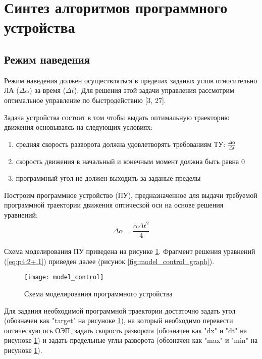 \section{Синтез алгоритмов программного устройства} \label{ch:ch4/sect2+}

\subsection{Режим наведения} \label{subsec:ch4/sect2/sub1}

Режим наведения должен осуществляться в пределах заданых углов относительно ЛА ($\varDelta\alpha$) за время ($\varDelta t$). Для решения этой задачи управления рассмотрим оптимальное управление по быстродействию [3, 27].

Задача устройства состоит в том чтобы выдать оптимальную траекторию движения основываясь на следующих условиях:
\begin{enumerate}
	\item средняя скорость разворота должна удовлетворять требованиям ТУ: 
	$\frac{\varDelta\alpha}{\varDelta t}$
	\item скорость движения в начальный и конечным момент должна быть равна 0
	\item программный угол не должен выходить за заданые пределы
\end{enumerate}

Построим программное устройство (ПУ), предназначенное для выдачи требуемой программной траектории движения оптической оси на основе решения уравнений:
\begin{equation}
\label{eq:p4:2+.1}
\begin{alignedat}{2}
\varDelta\alpha = \dfrac{\ddot{\alpha}{\varDelta t}^2}{4}
\end{alignedat}
\end{equation}

Схема моделирования ПУ приведена на рисунке \ref{fig:model_control}. Фрагмент решения уравнений (\ref{eq:p4:2+.1}) приведен далее (рисунок \ref{fig:model_control_graph}).

\begin{figure}[ht]
	\centering
	\texttt{[image: model\_control]} 
	\caption{Схема моделирования программного устройства}
	\label{fig:model_control}
\end{figure}

Для задания необходимой программной траектории достаточно задать угол (обозначен как "target" на рисуноке \ref{fig:model_control}), на который  необходимо перевести оптическую ось ОЭП, задать скорость разворота (обозначен как "dx" и "dt" на рисуноке \ref{fig:model_control}) и задать предельные углы разворота (обозначен как "max" и "min" на рисуноке \ref{fig:model_control}). 

